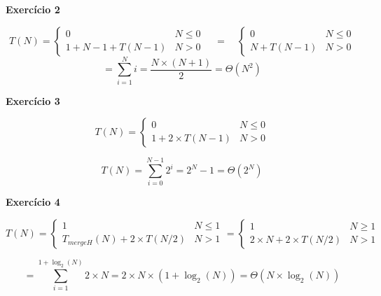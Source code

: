 \documentclass[a4paper,11pt]{article}
\begin{document}
	\noindent \textbf{Exercício 2}
	
	\[
		T(N) =
		\begin{cases}
			0 & N \leq 0 \\
			1 + N - 1 + T(N - 1) & N > 0
		\end{cases}
		\quad = \quad
		\begin{cases}
			0 & N \leq 0 \\
			N + T(N - 1) & N > 0
		\end{cases}
	\]
	\[
		= \sum_{i=1}^{N} i = \frac{N \times (N + 1)}{2} = \Theta(N^2)
	\]
	
	
	\noindent \textbf{Exercício 3}
	
	\[
		T(N) = 
		\begin{cases}
			0 & N \leq 0 \\
			1 + 2 \times T(N - 1) & N > 0
		\end{cases}
	\]
	
	\begin{figure}[h]
		\centering
	\end{figure}
	
	\[
		T(N) = \sum_{i=0}^{N-1} 2^i = 2^N - 1 = \Theta(2^N)
	\]
	
	\newpage
	
	\noindent \textbf{Exercício 4}
	
	\[
		T(N) = 
		\begin{cases}
			1 & N \leq 1 \\
			T_{mergeH}(N) + 2 \times T(N / 2) & N > 1
		\end{cases}
		=
		\begin{cases}
			1 & N \geq 1 \\
			2 \times N + 2 \times T(N/2) & N > 1
		\end{cases}
	\]
	
	\[
		= \sum_{i=1}^{1 + \log_2(N)} 2 \times N = 2 \times N \times (1 + \log_2(N)) = \Theta(N \times \log_2(N))
	\]
	
\end{document}
